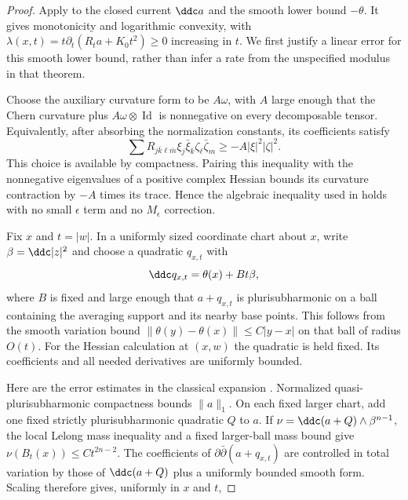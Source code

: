 \begin{proof}
Apply \cite[Theorem~4.1]{Dem94} to the closed current $\ddc a$ and the
smooth lower bound $-\theta$. It gives monotonicity and logarithmic
convexity, with
$\lambda(x,t)=t\partial_t(R_ta+K_0t^2)\geq0$ increasing in $t$.
We first justify a linear error for this smooth lower bound, rather than
infer a rate from the unspecified modulus in that theorem.

Choose the auxiliary curvature form to be $A\omega$, with $A$ large
enough that the Chern curvature plus $A\omega\otimes\operatorname{Id}$
is nonnegative on every decomposable tensor. Equivalently, after
absorbing the normalization constants, its coefficients satisfy
\[
 \sum R_{j\bar k\ell\bar m}\xi_j\bar\xi_k\zeta_\ell\bar\zeta_m
 \geq-A|\xi|^2|\zeta|^2.
\]
This choice is available by compactness. Pairing this inequality with
the nonnegative eigenvalues of a positive complex Hessian bounds its
curvature contraction by $-A$ times its trace. Hence the algebraic inequality used in
\cite[Lemma~4.4]{Dem94} holds with no small $\epsilon$ term and no
$M_\epsilon$ correction.

Fix $x$ and $t=|w|$. In a uniformly sized coordinate chart about $x$,
write $\beta=\ddc|z|^2$ and
choose a quadratic $q_{x,t}$ with
\[
 \ddc q_{x,t}=\theta(x)+Bt\beta,
\]
where $B$ is fixed and large enough that $a+q_{x,t}$ is plurisubharmonic
on a ball containing the averaging support and its nearby base points.
This follows from the smooth variation bound
$\|\theta(y)-\theta(x)\|\leq C|y-x|$ on that ball of radius $O(t)$.
For the Hessian calculation at $(x,w)$ the quadratic is held fixed.
Its coefficients and all needed derivatives are uniformly bounded.

Here are the error estimates in the classical expansion
\cite[Proposition~3.8, equations (3.11), (4.3), and (4.5)]{Dem94}.
Normalized quasi-plurisubharmonic compactness bounds $\|a\|_1$.
On each fixed larger chart, add one fixed strictly plurisubharmonic
quadratic $Q$ to $a$. If
$\nu=\ddc(a+Q)\wedge\beta^{n-1}$, the local Lelong mass inequality and
a fixed larger-ball mass bound give
$\nu(B_t(x))\leq Ct^{2n-2}$. The coefficients of
$\partial\bar\partial(a+q_{x,t})$ are controlled in total variation
by those of $\ddc(a+Q)$ plus a uniformly bounded smooth form. Scaling
therefore gives, uniformly in $x$ and $t$,


\end{proof}
